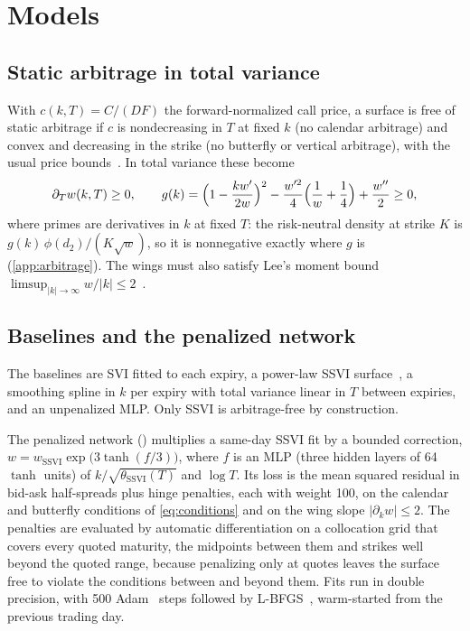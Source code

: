 \section{Models}
\label{sec:models}

\subsection{Static arbitrage in total variance}

With $c(k,T)=C/(DF)$ the forward-normalized call price, a surface is free of static arbitrage if
$c$ is nondecreasing in $T$ at fixed $k$ (no calendar arbitrage) and convex and decreasing in the
strike (no butterfly or vertical arbitrage), with the usual price bounds~\citep{carr2005}. In total
variance these become~\citep{gatheral2014}
\begin{equation}
  \partial_T w(k,T) \ge 0, \qquad
  g(k) = \Bigl(1-\frac{k w'}{2w}\Bigr)^{2} - \frac{w'^{2}}{4}\Bigl(\frac{1}{w}+\frac14\Bigr)
  + \frac{w''}{2} \ge 0,
  \label{eq:conditions}
\end{equation}
where primes are derivatives in $k$ at fixed $T$: the risk-neutral density at strike $K$ is
$g(k)\,\phi(d_2)/(K\sqrt{w})$, so it is nonnegative exactly where $g$ is (\cref{app:arbitrage}). The
wings must also satisfy Lee's moment bound $\limsup_{|k|\to\infty} w/|k|\le 2$~\citep{lee2004}.

\subsection{Baselines and the penalized network}

The baselines are SVI fitted to each expiry, a power-law SSVI surface~\citep{gatheral2014}, a
smoothing spline in $k$ per expiry with total variance linear in $T$ between expiries, and an
unpenalized MLP. Only SSVI is arbitrage-free by construction.

The penalized network (\pnn) multiplies a same-day SSVI fit by a bounded correction,
$w=w_{\text{SSVI}}\exp\bigl(3\tanh(f/3)\bigr)$, where $f$ is an MLP (three hidden layers of 64
$\tanh$ units) of $k/\sqrt{\theta_{\text{SSVI}}(T)}$ and $\log T$. Its loss is the mean squared
residual in bid-ask half-spreads plus hinge penalties, each with weight 100, on the calendar and
butterfly conditions of \cref{eq:conditions} and on the wing slope $|\partial_k w|\le 2$. The
penalties are evaluated by automatic differentiation on a collocation grid that covers every
quoted maturity, the midpoints between them and strikes well beyond the quoted range, because
penalizing only at quotes leaves the surface free to violate the conditions between and beyond
them. Fits run in double precision, with 500 Adam~\citep{kingma2015} steps followed by
L-BFGS~\citep{liu1989}, warm-started from the previous trading day.

